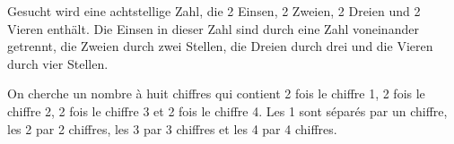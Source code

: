 Gesucht wird eine achtstellige Zahl, die 2 Einsen, 2 Zweien, 2 Dreien und 2 Vieren
enthält. Die Einsen in dieser Zahl sind durch eine Zahl voneinander getrennt, die Zweien
durch zwei Stellen, die Dreien durch drei und die Vieren durch vier Stellen.

\bigskip

On cherche un nombre à huit chiffres qui contient 2 fois le chiffre 1, 2 fois le chiffre 2,
2 fois le chiffre 3 et 2 fois le chiffre 4. Les 1 sont séparés par un chiffre, les 2 par 2 chiffres,
les 3 par 3 chiffres et les 4 par 4 chiffres.